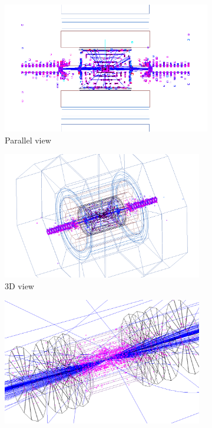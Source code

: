  \begin{figure}[h]
 \centering
  \begin{subfigure}[b]{0.32\textwidth}
   \centering
    \includegraphics[width=\textwidth]{Figures/Pairs/Event_display_ILC500_rhoz_view_inverted.png}
   \caption{Parallel view}
   \end{subfigure}
   \hfill
    \begin{subfigure}[b]{0.31\textwidth}
   \centering
    \includegraphics[width=0.96\textwidth]{Figures/Pairs/Event_display_ILC500_3D_view2_inverted.png}
   \caption{3D view}
   \end{subfigure}
    \hfill
    \begin{subfigure}[b]{0.3\textwidth}
   \centering
    \includegraphics[width=0.96\textwidth]{Figures/Pairs/Event_display_ILC500_vertex_3D_view2_inverted.png}

\end{subfigure}
\end{figure}

